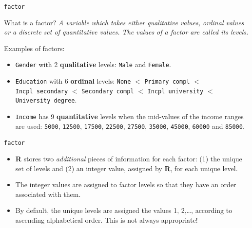 \documentclass[ignorenonframetext,]{beamer}
\providecommand{\tightlist}{%
  \setlength{\itemsep}{0pt}\setlength{\parskip}{0pt}}
\begin{document}
\begin{frame}[fragile]{\texttt{factor}}

\begin{block}{What is a factor?}
    \textit{A variable which takes either qualitative values, ordinal values or a discrete set of quantitative values. The values of a factor are called its \emph{levels}.}
  \end{block}

Examples of factors:

\begin{itemize}
\tightlist
\item
  \texttt{Gender} with 2 \textbf{qualitative} levels: \texttt{Male} and
  \texttt{Female}.
\item
  \texttt{Education} with 6 \textbf{ordinal} levels: \texttt{None} \(<\)
  \texttt{Primary\ compl} \(<\) \texttt{Incpl\ secondary} \(<\)
  \texttt{Secondary\ compl} \(<\) \texttt{Incpl\ university} \(<\)
  \texttt{University\ degree}.
\item
  \texttt{Income} has 9 \textbf{quantitative} levels when the mid-values
  of the income ranges are used: \texttt{5000}, \texttt{12500},
  \texttt{17500}, \texttt{22500}, \texttt{27500}, \texttt{35000},
  \texttt{45000}, \texttt{60000} and \texttt{85000}.
\end{itemize}

\end{frame}

\begin{frame}{\texttt{factor}}

\begin{itemize}
\tightlist
\item
  \textbf{R} stores two \emph{additional} pieces of information for each
  factor: (1) the unique set of levels and (2) an integer value,
  assigned by \textbf{R}, for each unique level.
\item
  The integer values are assigned to factor levels so that they have an
  order associated with them.
\item
  By default, the unique levels are assigned the values 1, 2,\ldots{},
  according to ascending alphabetical order. This is not always
  appropriate!
\end{itemize}

\end{frame}
\end{document}
